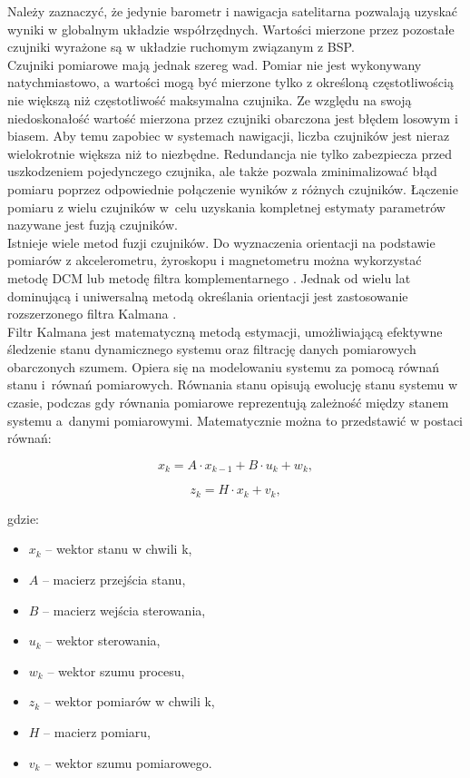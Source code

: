 Należy zaznaczyć, że jedynie barometr i nawigacja satelitarna pozwalają uzyskać wyniki w globalnym układzie współrzędnych. Wartości mierzone przez pozostałe czujniki wyrażone są w układzie ruchomym związanym z BSP.\\

Czujniki pomiarowe mają jednak szereg wad. Pomiar nie jest wykonywany natychmiastowo, a wartości mogą być mierzone tylko z określoną częstotliwością nie większą niż częstotliwość maksymalna czujnika. Ze względu na swoją niedoskonałość wartość mierzona przez czujniki obarczona jest błędem losowym i biasem. Aby temu zapobiec w systemach nawigacji, liczba czujników jest nieraz wielokrotnie większa niż to niezbędne. Redundancja nie tylko zabezpiecza przed uszkodzeniem pojedynczego czujnika, ale także pozwala zminimalizować błąd pomiaru poprzez odpowiednie połączenie wyników z różnych czujników. Łączenie pomiaru z wielu czujników w~celu uzyskania kompletnej estymaty parametrów nazywane jest fuzją czujników.\\

Istnieje wiele metod fuzji czujników. Do wyznaczenia orientacji na podstawie pomiarów z akcelerometru, żyroskopu i magnetometru można wykorzystać metodę DCM \cite{dcm} lub metodę filtra komplementarnego \cite{complementary}. Jednak od wielu lat dominującą i uniwersalną metodą określania orientacji jest zastosowanie rozszerzonego filtra Kalmana \cite{ekf_poor}.\\

Filtr Kalmana jest matematyczną metodą estymacji, umożliwiającą efektywne śledzenie stanu dynamicznego systemu oraz filtrację danych pomiarowych obarczonych szumem.
Opiera się na modelowaniu systemu za pomocą równań stanu i~równań pomiarowych. Równania stanu opisują ewolucję stanu systemu w czasie, podczas gdy równania pomiarowe reprezentują zależność między stanem systemu a~danymi pomiarowymi. Matematycznie można to przedstawić w postaci równań:

\[
  x_k = A \cdot x_{k-1} + B \cdot u_k + w_k,
\]

\[
  z_k = H \cdot x_k + v_k,
\]

gdzie:
\begin{itemize}
  \item $x_k$ -- wektor stanu w chwili k, 
  \item $A$ -- macierz przejścia stanu, 
  \item $B$  -- macierz wejścia sterowania, 
  \item $u_k$  -- wektor sterowania, 
  \item $w_k$ -- wektor szumu procesu, 
  \item $z_k$  -- wektor pomiarów w chwili  k, 
  \item $H$ -- macierz pomiaru,
  \item $v_k$ -- wektor szumu pomiarowego.
\end{itemize}

